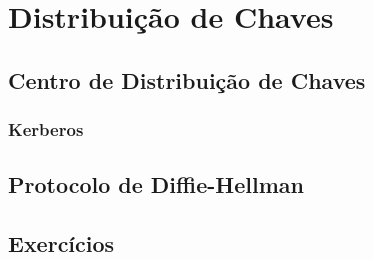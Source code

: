 \chapter{Distribuição de Chaves}
\label{cha:distribuicao-chaves}

\section{Centro de Distribuição de Chaves}
\label{sec:kdc}

\subsection{Kerberos}
\label{sec:kerberos}


\section{Protocolo de Diffie-Hellman}
\label{sec:diffie-hellman}


\section{Exercícios}
\label{sec:exercicios}

